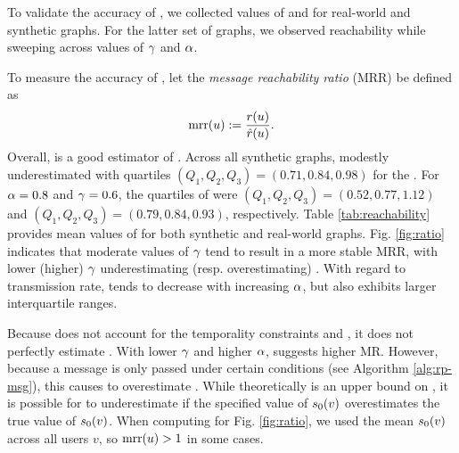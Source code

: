 To validate the accuracy of , we collected values of  and  for real-world and synthetic graphs. For the latter set of graphs, we observed reachability while sweeping across values of $\gamma$ and $\alpha$.

To measure the accuracy of , let the \emph{message reachability ratio} (MRR) be defined as
\begin{equation}\label{eq:mrr}
  \operatorname{mrr}(u) := \frac{r(u)}{\hat{r}(u)}.
\end{equation}
Overall,  is a good estimator of . Across all synthetic graphs,  modestly underestimated  with quartiles $(Q_1, Q_2, Q_3) = (0.71, 0.84, 0.98)$ for the . For $\alpha = 0.8$ and $\gamma = 0.6$, the quartiles of  were $(Q_1, Q_2, Q_3) = (0.52, 0.77, 1.12)$ and $(Q_1, Q_2, Q_3) = (0.79, 0.84, 0.93)$, respectively. Table \ref{tab:reachability} provides mean values of  for both synthetic and real-world graphs. Fig. \ref{fig:ratio} indicates that moderate values of $\gamma$ tend to result in a more stable MRR, with lower (higher) $\gamma$ underestimating (resp. overestimating) . With regard to transmission rate,  tends to decrease with increasing $\alpha$, but also exhibits larger interquartile ranges.

Because  does not account for the temporality constraints  and , it does not perfectly estimate . With lower $\gamma$ and higher $\alpha$,  suggests higher MR. However, because a message is only passed under certain conditions (see Algorithm \ref{alg:rp-msg}), this causes  to overestimate . While  theoretically is an upper bound on , it is possible for  to underestimate  if the specified value of $s_0(v)$ overestimates the true value of $s_0(v)$. When computing  for Fig. \ref{fig:ratio}, we used the mean $s_0(v)$ across all users $v$, so $\operatorname{mrr}(u) > 1$ in some cases.

